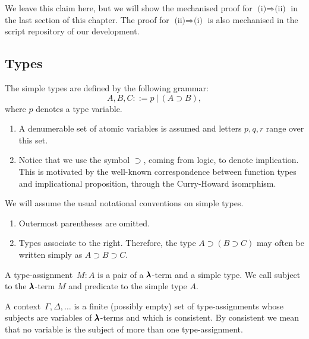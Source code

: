 We leave this claim here, but we will show the mechanised proof for $\boxed{\text{(i)} \Rightarrow \text{(ii)}}$ in the last section of this chapter.
The proof for $\boxed{\text{(ii)} \Rightarrow \text{(i)}}$ is also mechanised in the script repository of our development.


\subsection{Types}

\begin{definition}
  The simple types are defined by the following grammar:  
  \[
    A, B, C ::= p \ | \ (A \supset B),
  \]
  where $p$ denotes a type variable.
\end{definition}

\begin{remark} \hfill
  \begin{enumerate}
  \item A denumerable set of atomic variables is assumed and letters $p, q, r$ range over this set.
  \item Notice that we use the symbol $\supset$, coming from logic, to denote implication.
    This is motivated by the well-known correspondence between function types and implicational proposition, through the Curry-Howard isomrphism.
  \end{enumerate}
\end{remark}

\begin{notation}
  We will assume the usual notational conventions on simple types. 
  \begin{enumerate}
  \item Outermost parentheses are omitted.
  \item Types associate to the right. Therefore, the type $A \supset (B \supset C)$ may often be written simply as $A \supset B \supset C$.
  \end{enumerate}
\end{notation}

\begin{definition}
  A type-assignment~$M : A$ is a pair of a $\pmb{\lambda}$-term and a simple type.
  We call subject to the $\pmb{\lambda}$-term $M$ and predicate to the simple type $A$.
\end{definition}

\begin{definition}[Context]
  A context~$\Gamma, \Delta, \dots$ is a finite (possibly empty) set of type-assignments whose subjects are variables of $\pmb{\lambda}$-terms and which is consistent. By consistent we mean that no variable is the subject of more than one type-assignment.
\end{definition}

